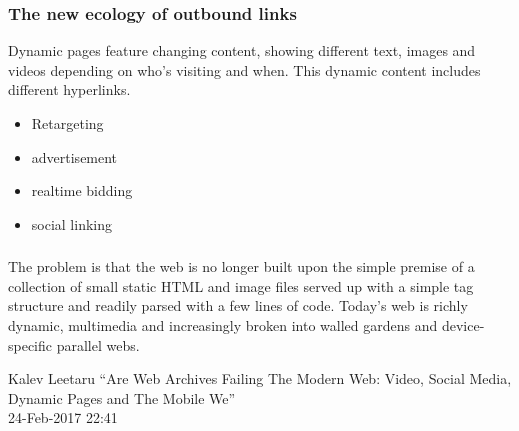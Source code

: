\documentclass[aspectratio=169]{beamer}
\begin{document}
\begin{frame}
\frametitle{The new ecology of outbound links}
Dynamic pages feature changing content, showing different text, images and videos depending on who's visiting and when. This dynamic content includes different hyperlinks. 
\begin{itemize}
\item{Retargeting}
\item{advertisement}
\item{realtime bidding}
\item{social linking}
\end{itemize}
\end{frame}


\begin{frame}
\frametitle{}

\epigraph{The problem is that the web is no longer built upon the simple premise of a collection of small static HTML and image files served up with a simple tag structure and readily parsed with a few lines of code. Today’s web is richly dynamic, multimedia and increasingly broken into walled gardens and device-specific parallel webs.}{Kalev Leetaru ``Are Web Archives Failing The Modern Web: Video, Social Media, Dynamic Pages and The Mobile We''\\ 24-Feb-2017 22:41}
\end{frame}
\end{document}
